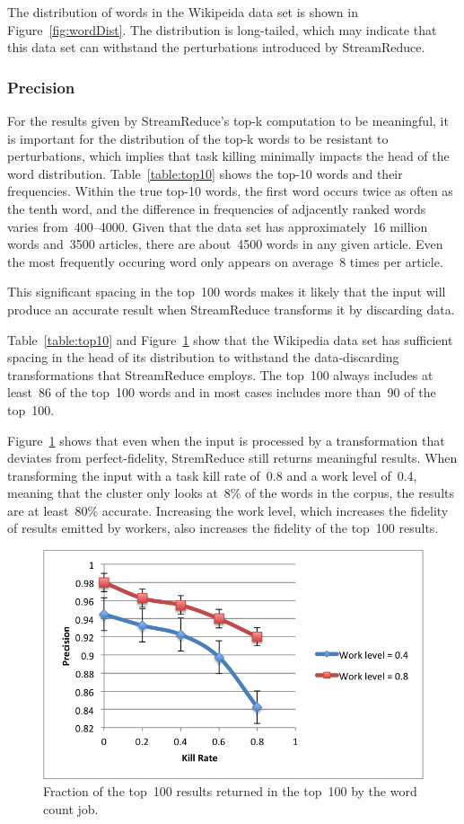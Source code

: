 \documentclass[12pt,twocolumn]{article}
\begin{document}
The distribution of words in the Wikipeida data set is
shown in Figure~\ref{fig:wordDist}. The distribution is long-tailed, which may indicate
that this data set can withstand the perturbations introduced by StreamReduce.

\subsubsection{Precision}
For the results given by StreamReduce's top-k computation to be meaningful,
it is important for the distribution of the top-k words to be resistant to perturbations,
which implies that task killing minimally impacts the head of the word distribution.
Table~\ref{table:top10} shows the top-10 words and their frequencies. Within the true top-10
words, the first word occurs twice as often as the tenth word, and the difference in frequencies
of adjacently ranked words varies from~400--4000. Given that the data set has approximately~16 million
words and~3500 articles, there are about~4500 words in any given article. Even the most frequently
occuring word only appears on average~8 times per article.

This significant spacing in the top~100 words makes it likely that the input will produce an
accurate result when StreamReduce transforms it by discarding data.

Table~\ref{table:top10} and Figure~\ref{fig:precision} show that the Wikipedia
data set has sufficient spacing in the head of its distribution to withstand the
data-discarding transformations that StreamReduce employs. The top~100 always includes at
least~86 of the top~100 words and in most cases includes more than~90 of the top~100.

Figure~\ref{fig:precision} shows that even when the input is processed by a transformation that deviates
from perfect-fidelity, StremReduce still returns meaningful results.
When transforming the input with a task kill rate of~0.8 and a work level of~0.4,
meaning that the cluster only looks at~8\% of the words in the corpus, the results
are at least~80\% accurate. Increasing the work level, which increases the fidelity of
results emitted by workers, also increases the fidelity of the top~100 results.

\begin{figure}
\includegraphics[width=\linewidth]{top-100-precision.png}
\caption{Fraction of the top~100 results returned in the top~100 by the word count job.}
\label{fig:precision}
\end{figure}
\end{document}
